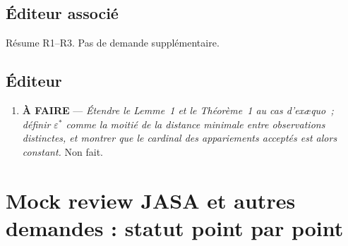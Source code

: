 \documentclass[11pt]{article}
\begin{document}
\subsection*{Éditeur associé}
Résume R1--R3. Pas de demande supplémentaire.

\subsection*{Éditeur}
\begin{enumerate}[leftmargin=*]
    \item \textcolor{red!70!black}{\textbf{À FAIRE}} --- \emph{Étendre le Lemme~1 et le Théorème~1
    au cas d'ex\ae quo~; définir $\varepsilon^*$ comme la moitié de la distance minimale entre
    observations distinctes, et montrer que le cardinal des appariements acceptés est alors
    constant.} Non fait.
\end{enumerate}

\section{Mock review JASA et autres demandes : statut point par point}
\label{sec:jasa_status}
\end{document}
